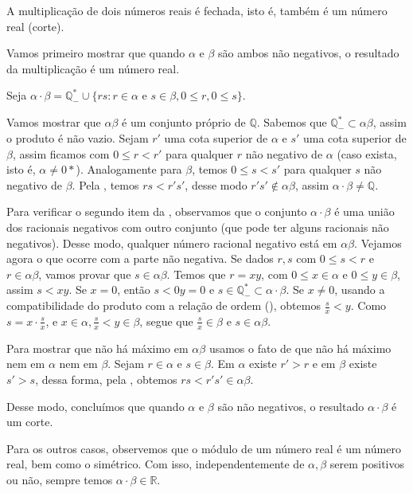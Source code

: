 \documentclass[../main.tex]{subfiles}
\begin{document}
\begin{prop}\label{reais-prop-produtoFechado}
    A multiplicação de dois números reais é fechada, isto é, também é um número real (corte).
\end{prop}
\begin{dem}
    Vamos primeiro mostrar que quando $\alpha$ e $\beta$ são ambos não negativos, o resultado da multiplicação é um número real. 

    Seja $\alpha \cdot \beta = \mathbb{Q}^*_{-} \cup \{ rs : r \in \alpha \text{ e } s \in \beta, 0 \leq r, 0 \leq s \}$.
    
    Vamos mostrar que $\alpha\beta$ é um conjunto próprio de $\mathbb{Q}$. Sabemos que $\mathbb{Q}^*_{-} \subset \alpha \beta$, assim o produto é não vazio. Sejam $r'$ uma cota superior de $\alpha$ e $s'$ uma cota superior de $\beta$, assim ficamos com $0 \leq r < r'$ para qualquer $r$ não negativo de $\alpha$ (caso exista, isto é, $\alpha \neq 0*$). Analogamente para $\beta$, temos $0 \leq s < s'$ para qualquer $s$ não negativo de $\beta$. Pela , temos $rs < r's'$, desse modo $r's' \not\in \alpha \beta$, assim $\alpha \cdot \beta \neq \mathbb{Q}$.

    Para verificar o segundo item da , observamos que o conjunto $\alpha \cdot \beta$ é uma união dos racionais negativos com outro conjunto (que pode ter alguns racionais não negativos). Desse modo, qualquer número racional negativo está em $\alpha \beta$. Vejamos agora o que ocorre com a parte não negativa. Se dados $r,s$ com $0 \leq s < r$ e $r \in \alpha \beta$, vamos provar que  $s \in \alpha \beta$. Temos que $r = xy$, com $0 \leq x \in \alpha$ e $0 \leq y \in \beta$, assim $s < xy$. Se $x = 0$, então $s < 0y = 0$ e $s \in \mathbb{Q}_{-}^* \subset \alpha \cdot \beta$. Se $x \neq 0$, usando a compatibilidade do produto com a relação de ordem (), obtemos $\frac{s}{x} < y$. Como $s = x \cdot \frac{s}{x}$, e $x \in \alpha, \frac{s}{x} < y \in \beta$, segue que $\frac{s}{x} \in \beta$ e $s \in \alpha \beta$.    

    Para mostrar que não há máximo em $\alpha \beta$ usamos o fato de que não há máximo nem em $\alpha$ nem em $\beta$. Sejam $r \in \alpha$ e $s \in \beta$. Em $\alpha$ existe $r' > r$ e em $\beta$ existe $s' > s$, dessa forma, pela , obtemos $rs < r's'  \in \alpha \beta$.

    Desse modo, concluímos que quando $\alpha$ e $\beta$ são não negativos, o resultado $\alpha \cdot \beta$ é um corte.

    Para os outros casos, observemos que o módulo de um número real é um número real, bem como o simétrico. Com isso, independentemente de $\alpha, \beta$ serem positivos ou não, sempre temos $\alpha \cdot \beta \in \mathbb{R}$.
\end{dem}
\end{document}
